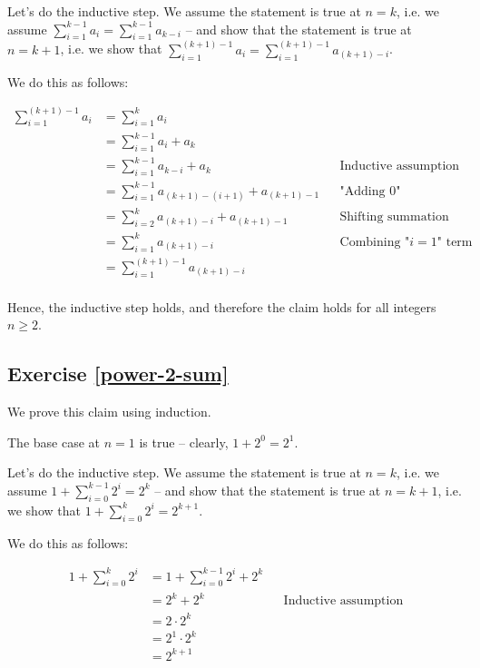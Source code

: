 \documentclass{article}
\begin{document}
Let's do the inductive step. We assume the statement is true at $n = k$, i.e. we assume $\sum_{i=1}^{k-1} a_i = \sum_{i=1}^{k-1} a_{k-i}$ -- and show that the statement is true at $n = k + 1$, i.e. we show that $\sum_{i=1}^{(k+1)-1} a_i = \sum_{i=1}^{(k+1)-1} a_{(k+1)-i}$.

We do this as follows:

\begin{align*}
\sum_{i=1}^{(k+1)-1} a_i &= \sum_{i=1}^{k} a_i \\
&= \sum_{i=1}^{k-1} a_i + a_k \\
&= \sum_{i=1}^{k-1} a_{k-i} + a_k && \text{Inductive assumption} \\
&= \sum_{i=1}^{k-1} a_{(k+1)-(i+1)} + a_{(k+1)-1} && \text{"Adding 0"} \\
&= \sum_{i=2}^{k} a_{(k+1)-i} + a_{(k+1)-1} && \text{Shifting summation index} \\
&= \sum_{i=1}^{k} a_{(k+1)-i} && \text{Combining "$i = 1$" term} \\
&= \sum_{i=1}^{(k+1)-1} a_{(k+1)-i} \\
\end{align*}

Hence, the inductive step holds, and therefore the claim holds for all integers $n \geq 2$. 



\subsection{Exercise \ref{power-2-sum}}

We prove this claim using induction. 

The base case at $n = 1$ is true -- clearly, $1 + 2^0 = 2^1$. 

Let's do the inductive step. We assume the statement is true at $n = k$, i.e. we assume $1 + \sum_{i=0}^{k-1} 2^i = 2^k$ -- and show that the statement is true at $n = k + 1$, i.e. we show that $1 + \sum_{i=0}^{k} 2^i = 2^{k+1}$.

We do this as follows: 


\begin{align*}
1 + \sum_{i=0}^{k} 2^i &= 1 + \sum_{i=0}^{k-1} 2^i + 2^k \\
&= 2^k + 2^k && \text{Inductive assumption} \\
&= 2 \cdot 2^k \\
&= 2^1 \cdot 2^k \\
&= 2^{k+1} \\
\end{align*}
\end{document}
